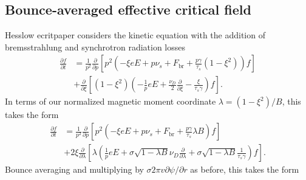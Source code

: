 \documentclass[11pt,a4paper]{article}
\newcommand{\sub}[1]{\ensuremath{_{\text{#1}}}}
\begin{document}
\subsection{Bounce-averaged effective critical field}
Hesslow ecritpaper considers the kinetic equation with the addition of bremsstrahlung and synchrotron radiation losses
\begin{align}
\frac{\partial f}{\partial t} &= \frac{1}{p^2}\frac{\partial}{\partial p}\left[ p^2\left(-\xi eE + p\nu_s + F\sub{br}+\frac{p\gamma}{\tau_s}(1-\xi^2)\right)f\right] \nonumber \\
&+\frac{\partial}{\partial \xi}\left[ (1-\xi^2)\left( -\frac{1}{p}eE + \frac{\nu_D}{2}\frac{\partial}{\partial \xi} - \frac{\xi}{\tau_s \gamma} \right)f\right].
\end{align}
In terms of our normalized magnetic moment coordinate $\lambda = (1-\xi^2)/B$, this takes the form
\begin{align}
\frac{\partial f}{\partial t} &= \frac{1}{p^2}\frac{\partial}{\partial p}\left[ p^2\left(-\xi eE + p\nu_s + F\sub{br}+\frac{p\gamma}{\tau_s}\lambda B \right)f\right] \nonumber \\
& +2\xi \frac{\partial}{\partial \lambda}\left[\lambda \left( \frac{1}{p}eE  + \sigma \sqrt{1-\lambda B} \nu_D\frac{\partial}{\partial \lambda} + \sigma\sqrt{1-\lambda B} \frac{1}{\tau_s\gamma} \right)f\right].
\end{align}
Bounce averaging and multiplying by $\sigma 2\pi v \partial \psi/\partial r$ as before, this takes the form
\end{document}
